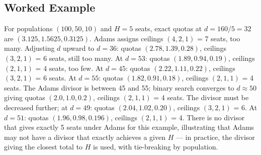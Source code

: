 \subsection{Worked Example}

For populations $(100, 50, 10)$ and $H = 5$ seats,
exact quotas at $d = 160/5 = 32$ are $(3.125, 1.5625, 0.3125)$.
Adams assigns ceilings $(4, 2, 1)$ = 7 seats, too many.
Adjusting $d$ upward to $d = 36$: quotas $(2.78, 1.39, 0.28)$,
ceilings $(3, 2, 1)$ = 6 seats, still too many.
At $d = 53$: quotas $(1.89, 0.94, 0.19)$,
ceilings $(2, 1, 1)$ = 4 seats, too few.
At $d = 45$: quotas $(2.22, 1.11, 0.22)$,
ceilings $(3, 2, 1)$ = 6 seats.
At $d = 55$: quotas $(1.82, 0.91, 0.18)$,
ceilings $(2, 1, 1)$ = 4 seats.
The Adams divisor is between 45 and 55; binary search converges
to $d \approx 50$ giving quotas $(2.0, 1.0, 0.2)$,
ceilings $(2, 1, 1)$ = 4 seats.
The divisor must be decreased further; at $d = 49$:
quotas $(2.04, 1.02, 0.20)$, ceilings $(3, 2, 1)$ = 6.
At $d = 51$: quotas $(1.96, 0.98, 0.196)$, ceilings $(2, 1, 1)$ = 4.
There is no divisor that gives exactly 5 seats under Adams for this example,
illustrating that Adams may not have a divisor that exactly achieves
a given $H$ --- in practice, the divisor giving the closest total
to $H$ is used, with tie-breaking by population.
